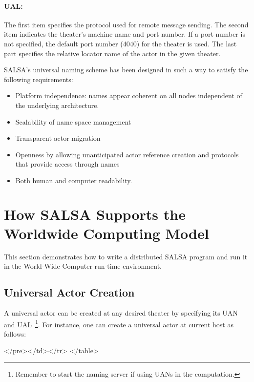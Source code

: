 \paragraph{UAL:} The first item specifies the protocol used for remote message sending. The second 
item indicates the theater's machine name and port number. If a port number is not specified, the 
default port number (4040) for the theater is used.  The last part specifies the relative locator name 
of the actor in the given 
theater.

SALSA's universal naming scheme has been designed in such a way to satisfy the following requirements:
\begin{itemize}
\item Platform independence: names appear coherent on all nodes independent of the 
underlying architecture.
\item Scalability of name space management
\item Transparent actor migration
\item Openness by allowing unanticipated actor reference creation and protocols that 
provide access through names
\item Both human and computer readability.
\end{itemize}

\section{How SALSA Supports the Worldwide Computing Model}
\label{How SALSA Supports the Worldwide Computing Model}
This section demonstrates how to write a distributed
SALSA program and run it in the World-Wide Computer run-time environment.

\subsection{Universal Actor Creation}
A universal actor can be created at any desired theater by specifying its 
UAN and UAL~\footnote{Remember to start the naming server if
using UANs in the computation.}.
For instance, one can create a universal actor at current 
host as follows:
{\singlespace

}
\begin{htmlonly}

 \begin{rawhtml} 
   </pre></td></tr>
  </table>
\end{rawhtml} 
\end{htmlonly}
 
